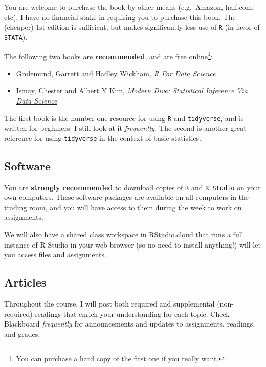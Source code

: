 \documentclass{article}
\providecommand{\tightlist}{%
  \setlength{\itemsep}{0pt}\setlength{\parskip}{0pt}}
\begin{document}
You are welcome to purchase the book by other means (e.g.~Amazon,
half.com, etc). I have no financial stake in requiring you to purchase
this book. The (cheaper) 1st edition is sufficient, but makes
significantly less use of \texttt{R} (in favor of \texttt{STATA}).

The following two books are \textbf{recommended}, and are free
online\footnote{You can purchase a hard copy of the first one if you
  really want.}:

\begin{itemize}
\tightlist
\item
  Grolemund, Garrett and Hadley Wickham,
  \href{https://r4ds.had.co.nz/}{\emph{R For Data Science}}
\item
  Ismay, Chester and Albert Y Kim,
  \href{https://moderndive.com/}{\emph{Modern Dive: Statistical
  Inference Via Data Science}}
\end{itemize}

The first book is the number one resource for using \texttt{R} and
\texttt{tidyverse}, and is written for beginners. I still look at it
\emph{frequently.} The second is another great reference for using
\texttt{tidyverse} in the context of basic statistics.

\hypertarget{software}{%
\subsection{Software}\label{software}}

You are \textbf{strongly recommended} to download copies of
\href{https://www.r-project.org/}{\texttt{R}} and
\href{http://www.rstudio.com}{\texttt{R\ Studio}} on your own computers.
These software packages are available on all computers in the trading
room, and you will have access to them during the week to work on
assignments.

We will also have a shared class workspace in
\href{http://rstudio.cloud/}{RStudio.cloud} that runs a full instance of
R Studio in your web browser (so no need to install anything!) will let
you access files and assignments.

\hypertarget{articles}{%
\subsection{Articles}\label{articles}}

Throughout the course, I will post both required and supplemental
(non-required) readings that enrich your understanding for each topic.
Check Blackboard \emph{frequently} for announcements and updates to
assignments, readings, and grades.
\end{document}
